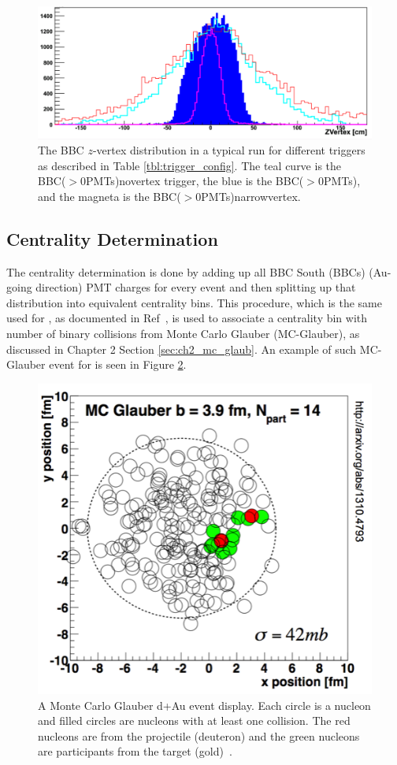 \begin{figure}[h!]
\centering
\includegraphics[width=0.65\linewidth]{figs/bbc_z_vertex_dist.png}
\caption{The BBC $z$-vertex distribution in a typical \pau run for different triggers as described in Table \ref{tbl:trigger_config}.  The teal curve is the BBC($>$0\thinspace PMTs)\thinspace novertex trigger, the blue is the BBC($>$0\thinspace PMTs), and the magneta is the BBC($>$0\thinspace PMTs)\thinspace narrowvertex.}
\label{fig:bbc_z_vtx_dist}
\end{figure}

\subsection{Centrality Determination}
\label{sec:central_determin}
The centrality determination is done by adding up all BBC South (BBCs) (Au-going direction) PMT charges for every event and then splitting up that distribution into equivalent centrality bins. This procedure, which is the same used for \dau, as documented in Ref~\cite{PhysRevC.90.034902}, is used to associate a centrality bin with number of binary collisions from Monte Carlo Glauber (MC-Glauber), as discussed in Chapter 2 Section \ref{sec:ch2_mc_glaub}. An example of such MC-Glauber event for \dau is seen in Figure \ref{fig:glauber_event_display}.  
\label{centrality_determination}
\begin{figure}[!ht]
\centering
\includegraphics[width=0.5\linewidth]{figs/glauber_event_display.png}
\caption{A Monte Carlo Glauber d+Au event display. Each circle is a nucleon and filled circles are nucleons with at least one collision. The red nucleons are from the projectile (deuteron) and the green nucleons are participants from the target (gold)~\cite{PhysRevC.90.034902}.}
\label{fig:glauber_event_display}
\end{figure}

